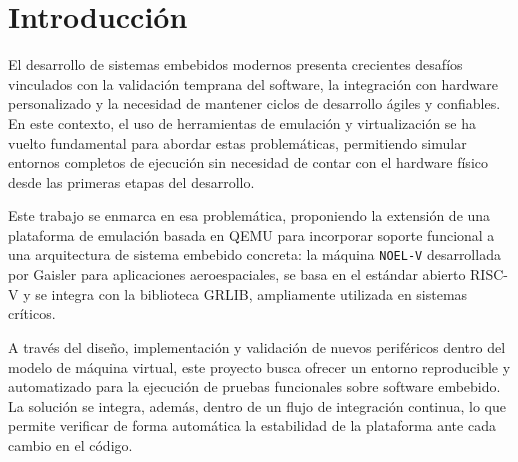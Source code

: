% 
% 
% 
% 
% 
% 
% 
% 

\chapter{Introducción}
\label{cha:introduccion}

El desarrollo de sistemas embebidos modernos presenta crecientes desafíos vinculados con la validación temprana del software, la integración con hardware personalizado y la necesidad de mantener ciclos de desarrollo ágiles y confiables. En este contexto, el uso de herramientas de emulación y virtualización se ha vuelto fundamental para abordar estas problemáticas, permitiendo simular entornos completos de ejecución sin necesidad de contar con el hardware físico desde las primeras etapas del desarrollo.

Este trabajo se enmarca en esa problemática, proponiendo la extensión de una plataforma de emulación basada en QEMU para incorporar soporte funcional a una arquitectura de sistema embebido concreta: la máquina \texttt{NOEL-V} desarrollada por Gaisler para aplicaciones aeroespaciales, se basa en el estándar abierto RISC-V y se integra con la biblioteca GRLIB, ampliamente utilizada en sistemas críticos.

A través del diseño, implementación y validación de nuevos periféricos dentro del modelo de máquina virtual, este proyecto busca ofrecer un entorno reproducible y automatizado para la ejecución de pruebas funcionales sobre software embebido. La solución se integra, además, dentro de un flujo de integración continua, lo que permite verificar de forma automática la estabilidad de la plataforma ante cada cambio en el código.

